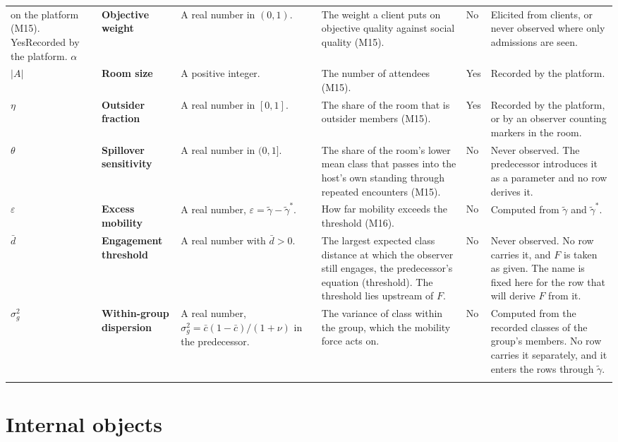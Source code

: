 \documentclass[11pt]{article}
\newcommand{\mm}[6]{#1 & \textbf{#2} & #3 & #4 & #5 & #6 \\ \addlinespace}
\begin{document}
\begin{longtable}{@{}P{1.8cm}P{2.1cm}P{2.2cm}P{3.7cm}P{1.3cm}P{3.7cm}@{}}
{  on the platform (M15).}
  {Yes}{Recorded by the platform.}
\mm{$\alpha$}{Objective weight}{A real number in $(0,1)$.}{The weight a
  client puts on objective quality against social quality (M15).}
  {No}{Elicited
  from clients, or never observed where only admissions are seen.}
\mm{$|A|$}{Room size}{A positive integer.}{The number of attendees
  (M15).}
  {Yes}{Recorded by the platform.}
\mm{$\eta$}{Outsider fraction}{A real number in $[0,1]$.}{The share of the
  room that is outsider members (M15).}
  {Yes}{Recorded by the platform, or by an
  observer counting markers in the room.}
\mm{$\theta$}{Spillover sensitivity}{A real number in $(0,1]$.}{The share of
  the room's lower mean class that passes into the host's own standing
  through repeated encounters (M15).}
  {No}{Never observed. The predecessor
  introduces it as a parameter and no row derives it.}
\mm{$\varepsilon$}{Excess mobility}{A real number, $\varepsilon=\tilde\gamma-\tilde\gamma^\ast$.}{How
  far mobility exceeds the threshold (M16).}
  {No}{Computed from $\tilde\gamma$
  and $\tilde\gamma^\ast$.}
\mm{$\bar d$}{Engagement threshold}{A real number with $\bar d>0$.}{The
  largest expected class distance at which the observer still engages, the
  predecessor's equation (threshold). The threshold lies upstream of $F$.}
  {No}{Never observed.
  No row carries it, and $F$ is taken as given. The name is fixed
  here for the row that will derive $F$ from it.}
\mm{$\sigma_g^2$}{Within-group dispersion}{A real number,
  $\sigma_g^2=\bar c(1-\bar c)/(1+\nu)$ in the predecessor.}{The variance of
  class within the group, which the mobility force acts on.}
  {No}{Computed from the
  recorded classes of the group's members. No row carries it separately, and
  it enters the rows through $\tilde\gamma$.}
\end{longtable}
\normalsize

\section*{Internal objects}
\end{document}
